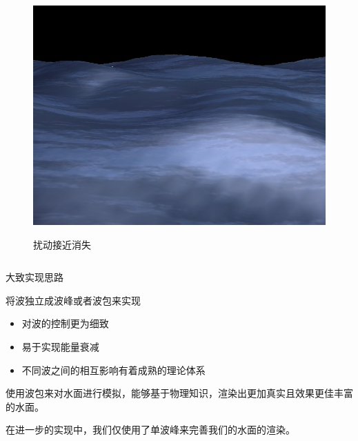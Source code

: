 \documentclass[handout,t]{beamer}
\begin{document}
\begin{frame}
\begin{columns}
\begin{column}
\begin{figure}[thpb]
{        \includegraphics{figure/2018-07-03-01-59-47.png}
        }
        \label{fig:wyf-single-right}
        \caption{扰动接近消失}
    \end{figure}
  \end{column}%
\end{columns}


\end{frame}


\begin{frame}{大致实现思路}
  
将波独立成波峰或者波包来实现

\begin{itemize}
  \item 对波的控制更为细致
  \item 易于实现能量衰减
  \item 不同波之间的相互影响有着成熟的理论体系
\end{itemize}

使用波包来对水面进行模拟，能够基于物理知识，渲染出更加真实且效果更佳丰富的水面。

在进一步的实现中，我们仅使用了单波峰来完善我们的水面的渲染。

  
\end{frame}
\end{document}
